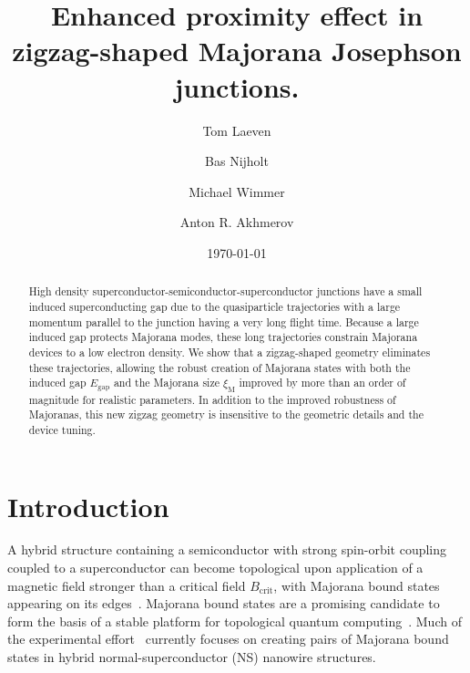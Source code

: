 \documentclass[english, twocolumn, 10pt, aps, superscriptaddress, floatfix, prb, citeautoscript]{revtex4-1}
\renewcommand{\comment}[2]{#2}
\begin{document}
\title{Enhanced proximity effect in zigzag-shaped Majorana Josephson junctions.}

\author{Tom Laeven}
\author{Bas Nijholt}
\author{Michael Wimmer}
\author{Anton R. Akhmerov}

\date{\today}
\begin{abstract}
High density superconductor-semiconductor-superconductor junctions have a small induced superconducting gap due to the quasiparticle trajectories with a large momentum parallel to the junction having a very long flight time.
Because a large induced gap protects Majorana modes, these long trajectories constrain Majorana devices to a low electron density.
We show that a zigzag-shaped geometry eliminates these trajectories, allowing the robust creation of Majorana states with both the induced gap $E_\textrm{gap}$ and the Majorana size $\xi_\textrm{M}$ improved by more than an order of magnitude for realistic parameters.
In addition to the improved robustness of Majoranas, this new zigzag geometry is insensitive to the geometric details and the device tuning.
\end{abstract}

\maketitle

\section{Introduction}
\comment{Hybrid NS structures become topological and are useful for TQC.}
A hybrid structure containing a semiconductor with strong spin-orbit coupling coupled to a superconductor can become topological upon application of a magnetic field stronger than a critical field $B_\textrm{crit}$, with Majorana bound states appearing on its edges~\cite{Lutchyn2010,Oreg2010}.
Majorana bound states are a promising candidate to form the basis of a stable platform for topological quantum computing~\cite{Alicea2012,Beenakker2013,Beenakker2016,Leijnse2012}.
Much of the experimental effort~\cite{Mourik2012,Das2012,Deng2012,Churchill2013,Zhang2018} currently focuses on creating pairs of Majorana bound states in hybrid normal-superconductor (NS) nanowire structures.
\end{document}
